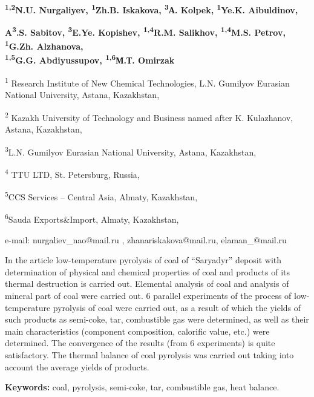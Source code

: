 \begin{center}
{\bfseries \textsuperscript{1,2}N.U. Nurgaliyev, \textsuperscript{1}Zh.B.
Iskakova, \textsuperscript{3}А. Kolpek, \textsuperscript{1}Ye.K.
Aibuldinov,}

{\bfseries A\textsuperscript{3}.S. Sabitov, \textsuperscript{3}E.Ye.
Kopishev, \textsuperscript{1,4}R.M. Salikhov, \textsuperscript{1,4}M.S.
Petrov, \textsuperscript{1}G.Zh. Alzhanova,\\
\textsuperscript{1,5}G.G. Abdiyussupov, \textsuperscript{1,6}М.Т.
Omirzak}

\textsuperscript{1} Research Institute of New Chemical Technologies,
L.N. Gumilyov Eurasian National University, Astana, Kazakhstan,

\textsuperscript{2} Kazakh University of Technology and Business named
after K. Kulazhanov, Astana, Kazakhstan,

\textsuperscript{3}L.N. Gumilyov Eurasian National University, Astana,
Kazakhstan,

\textsuperscript{4} TTU LTD, St. Petersburg, Russia,

\textsuperscript{5}CCS Services -- Central Asia, Almaty, Kazakhstan,

\textsuperscript{6}Sauda Exports\&Import, Almaty, Kazakhstan,

e-mail: nurgaliev\_nao@mail.ru , zhanariskakova@mail.ru,
elaman\_@mail.ru
\end{center}

In the article low-temperature pyrolysis of coal of ``Saryadyr'' deposit
with determination of physical and chemical properties of coal and
products of its thermal destruction is carried out. Elemental analysis
of coal and analysis of mineral part of coal were carried out. 6
parallel experiments of the process of low-temperature pyrolysis of coal
were carried out, as a result of which the yields of such products as
semi-coke, tar, combustible gas were determined, as well as their main
characteristics (component composition, calorific value, etc.) were
determined. The convergence of the results (from 6 experiments) is quite
satisfactory. The thermal balance of coal pyrolysis was carried out
taking into account the average yields of products.

{\bfseries Keywords:} coal, pyrolysis, semi-coke, tar, combustible gas,
heat balance.

